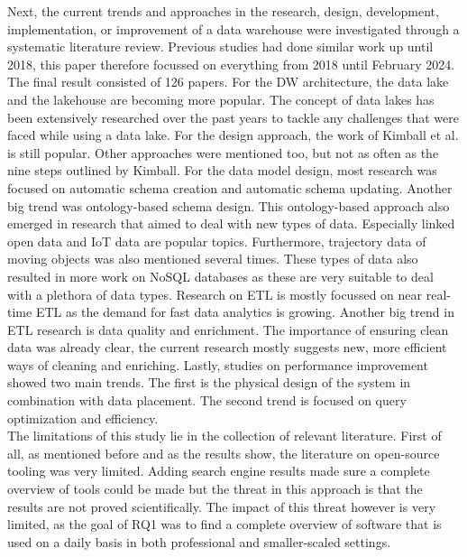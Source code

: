 \documentclass[11pt]{article}
\begin{document}
Next, the current trends and approaches in the research, design, development, implementation, or improvement of a data warehouse were investigated through a systematic literature review. Previous studies had done similar work up until 2018, this paper therefore focussed on everything from 2018 until February 2024. The final result consisted of 126 papers. For the DW architecture, the data lake and the lakehouse are becoming more popular. The concept of data lakes has been extensively researched over the past years to tackle any challenges that were faced while using a data lake. For the design approach, the work of Kimball et al. \cite{kimball2011data} is still popular. Other approaches were mentioned too, but not as often as the nine steps outlined by Kimball. For the data model design, most research was focused on automatic schema creation and automatic schema updating. Another big trend was ontology-based schema design. This ontology-based approach also emerged in research that aimed to deal with new types of data. Especially linked open data and IoT data are popular topics. Furthermore, trajectory data of moving objects was also mentioned several times. These types of data also resulted in more work on NoSQL databases as these are very suitable to deal with a plethora of data types. Research on ETL is mostly focussed on near real-time ETL as the demand for fast data analytics is growing. Another big trend in ETL research is data quality and enrichment. The importance of ensuring clean data was already clear, the current research mostly suggests new, more efficient ways of cleaning and enriching. Lastly, studies on performance improvement showed two main trends. The first is the physical design of the system in combination with data placement. The second trend is focused on query optimization and efficiency. \\

The limitations of this study lie in the collection of relevant literature. First of all, as mentioned before and as the results show, the literature on open-source tooling was very limited. Adding search engine results made sure a complete overview of tools could be made but the threat in this approach is that the results are not proved scientifically. The impact of this threat however is very limited, as the goal of RQ1 was to find a complete overview of software that is used on a daily basis in both professional and smaller-scaled settings. \\
\end{document}
